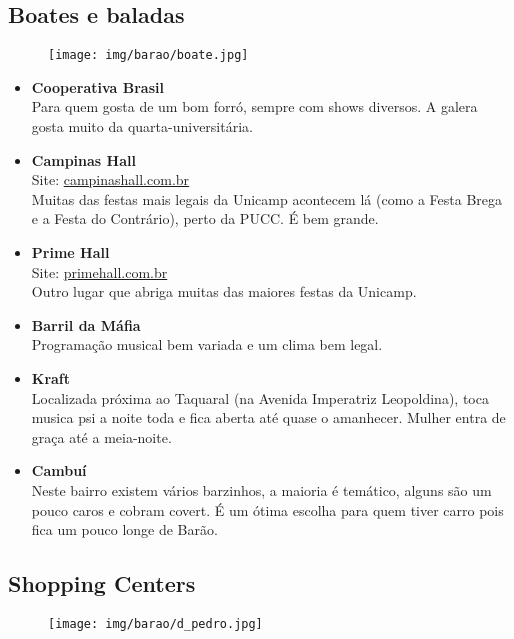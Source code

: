 \subsection{Boates e baladas}

\begin{figure}[h!]
  \centering
  \texttt{[image: img/barao/boate.jpg]}
\end{figure}

\begin{itemize}
\item \textbf{Cooperativa Brasil}
  \\Para quem gosta de um bom forró, sempre com shows diversos. A galera gosta
  muito da quarta-universitária.

\item \textbf{Campinas Hall}
  \\Site: \url{campinashall.com.br}
  \\Muitas das festas mais legais da Unicamp acontecem lá (como a Festa Brega e
  a Festa do Contrário), perto da PUCC. É bem grande.

\item \textbf{Prime Hall}
  \\Site: \url{primehall.com.br}
  \\Outro lugar que abriga muitas das maiores festas da Unicamp.

\item \textbf{Barril da Máfia}
  \\Programação musical bem variada e um clima bem legal.

\item \textbf{Kraft}
  \\Localizada próxima ao Taquaral (na Avenida Imperatriz Leopoldina), toca
  musica psi a noite toda e fica aberta até quase o amanhecer. Mulher entra de
  graça até a meia-noite.

\item \textbf{Cambuí}
  \\Neste bairro existem vários barzinhos, a maioria é temático, alguns são um
  pouco caros e cobram covert. É um ótima escolha para quem tiver carro pois
  fica um pouco longe de Barão.
\end{itemize}

\subsection{Shopping Centers}

\begin{figure}[h!]
  \centering
  \texttt{[image: img/barao/d\_pedro.jpg]}
\end{figure}

